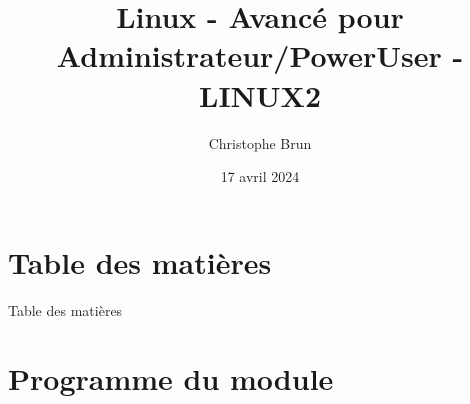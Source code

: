 \documentclass{beamer}
\title[LINUX2]{Linux - Avancé pour Administrateur/PowerUser - LINUX2}
\author{Christophe Brun}
\institute{Digicomp}
\date{17 avril 2024}
\begin{document}
    \begin{frame}
        \titlepage
    \end{frame}


    \section{Table des matières}\label{sec:toc}

    \begin{frame}{Table des matières}
        \begin{tiny}
            \begin{multicols}{2}
                \tableofcontents
            \end{multicols}
        \end{tiny}
    \end{frame}


    \section{Programme du module}\label{sec:programme-du-module}
\end{document}
